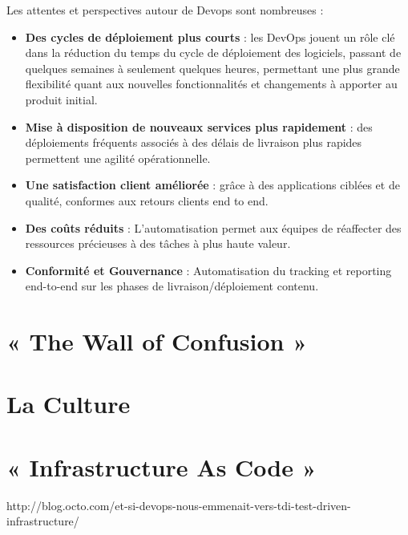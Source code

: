 Les attentes et perspectives autour de Devops sont nombreuses :\\

\begin{itemize}
  \item \textbf{Des cycles de déploiement plus courts} : les DevOps jouent un rôle clé dans la réduction du temps du cycle de déploiement des logiciels, passant de quelques semaines à seulement quelques heures, permettant une plus grande flexibilité quant aux nouvelles fonctionnalités et changements à apporter au produit initial.
  \item \textbf{Mise à disposition de nouveaux services plus rapidement} : des déploiements fréquents associés à des délais de livraison plus rapides permettent une agilité opérationnelle.
  \item \textbf{Une satisfaction client améliorée} : grâce à des applications ciblées et de qualité, conformes aux retours clients end to end.
  \item \textbf{Des coûts réduits} : L’automatisation permet aux équipes de réaffecter des ressources précieuses à des tâches à plus haute valeur.
  \item \textbf{Conformité et Gouvernance} : Automatisation du tracking et reporting end-to-end sur les phases de livraison/déploiement contenu.\\
\end{itemize}

\section{« The Wall of Confusion »}

\section{La Culture}

\section{« Infrastructure As Code »}

http://blog.octo.com/et-si-devops-nous-emmenait-vers-tdi-test-driven-infrastructure/
